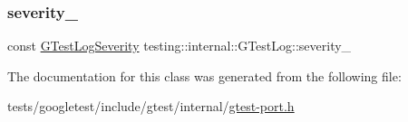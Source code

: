 \subsubsection{\texorpdfstring{severity\+\_\+}{severity\_}}
{\footnotesize\ttfamily const \hyperlink{namespacetesting_1_1internal_aa6255ef3b023c5b4e1a2198d887fb977}{G\+Test\+Log\+Severity} testing\+::internal\+::\+G\+Test\+Log\+::severity\+\_\+\hspace{0.3cm}{\ttfamily [private]}}



The documentation for this class was generated from the following file\+:\begin{DoxyCompactItemize}
\item 
tests/googletest/include/gtest/internal/\hyperlink{gtest-port_8h}{gtest-\/port.\+h}\end{DoxyCompactItemize}
